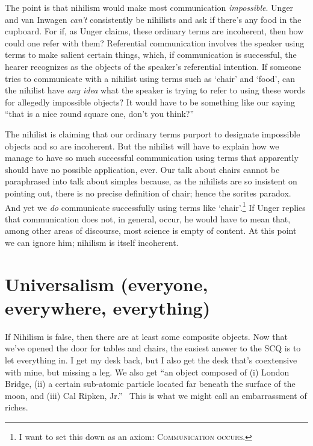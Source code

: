 
The point is that nihilism would make most communication {\em impossible}. Unger and van Inwagen {\em can't} consistently be nihilists and ask if there's any food in the cupboard. For if, as Unger claims, these ordinary terms are incoherent, then how could one refer with them? Referential communication involves the speaker using terms to make salient certain things, which, if communication is successful, the hearer recognizes as the objects of the speaker's referential intention. If someone tries to communicate with a nihilist using terms such as `chair' and `food', can the nihilist have {\em any idea} what the speaker is trying to refer to using these words for allegedly impossible objects? It would have to be something like our saying ``that is a nice round square one, don't you think?''%
%

The nihilist is claiming that our ordinary terms purport to designate impossible objects and so are incoherent. But the nihilist will have to explain how we manage to have so much successful communication using terms that apparently should have no possible application, ever. Our talk about chairs cannot be paraphrased into talk about simples because, as the nihilists are so insistent on pointing out, there is no precise definition of chair; hence the sorites paradox. And yet we {\em do} communicate successfully using terms like `chair'.\footnote{I want to set this down as an axiom: \textsc{Communication occurs.}} If Unger replies that communication does not, in general, occur, he would have to mean that, among other areas of discourse, most science is empty of content. At this point we can ignore him; nihilism is itself incoherent.

\section{Universalism (everyone, everywhere, everything)}
If Nihilism is false, then there are at least some composite objects. Now that we've opened the door for tables and chairs, the easiest answer to the SCQ is to let everything in. I get my desk back, but I also get the desk that's coextensive with mine, but missing a leg. We also get ``an object composed of (i) London Bridge, (ii) a certain sub-atomic particle located far beneath the surface of the moon, and (iii) Cal Ripken, Jr.''~\citep[228]{markosian1998a} %
This is what we might call an embarrassment of riches.

